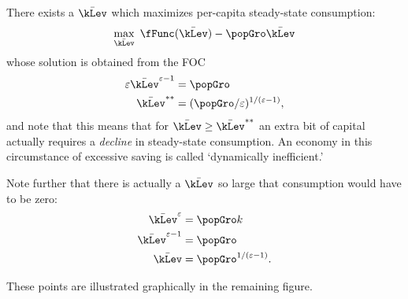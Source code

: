 \documentclass{handout}
\begin{document}
There exists a $\bar{\kLev}$ which maximizes per-capita
steady-state consumption:
\begin{equation}\begin{gathered}\begin{aligned}
  \max_{\bar{\kLev}} ~ \fFunc(\bar{\kLev}) - \popGro \bar{\kLev}
\end{aligned}\end{gathered}\end{equation}
whose solution is obtained from the FOC
\begin{equation}\begin{gathered}\begin{aligned}
  \varepsilon \bar{\kLev}^{\varepsilon-1} & =  \popGro
\\ \bar{\kLev}^{**} & =  (\popGro/\varepsilon)^{1/(\varepsilon-1)},
\end{aligned}\end{gathered}\end{equation}
and note that this means that for $\bar{\kLev} \geq \bar{\kLev}^{**}$ 
an extra bit of capital actually requires a {\it decline} in 
steady-state consumption.  An economy in this circumstance of 
excessive saving is called `dynamically inefficient.'

Note further that there is actually a $\bar{\kLev}$ so large that
consumption would have to be zero:
\begin{equation}\begin{gathered}\begin{aligned}
  \bar{\kLev}^{\varepsilon} & =  \popGro k
\\ \bar{\kLev}^{\varepsilon-1} & =  \popGro
\\ \bar{\kLev} & =  \popGro^{1/(\varepsilon-1)}.
\end{aligned}\end{gathered}\end{equation}

These points are illustrated graphically in the remaining figure.
\end{document}
